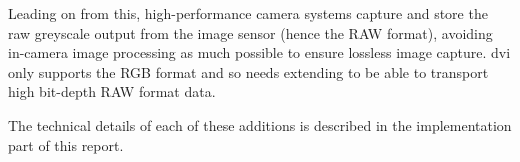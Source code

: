 Leading on from this, high-performance camera systems capture and store the raw greyscale output from the image sensor (hence the RAW format), avoiding in-camera image processing as much possible to ensure lossless image capture. \gls{dvi} only supports the RGB format and so needs extending to be able to transport high bit-depth RAW format data.
 
The technical details of each of these additions is described in the implementation part of this report.

